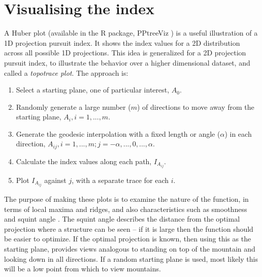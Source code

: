 \documentclass[]{interact}
\theoremstyle{plain}%
\theoremstyle{definition}
\theoremstyle{remark}
\def\tightlist{}
\begin{document}
\hypertarget{visualising-the-index}{%
\section{\texorpdfstring{Visualising the index
\label{sec:viz}}{Visualising the index }}\label{visualising-the-index}}

A Huber plot \citep{huberpp} (available in the R package, PPtreeViz
\citep{pptreeviz}) is a useful illustration of a 1D projection pursuit
index. It shows the index values for a 2D distribution across all
possible 1D projections. This idea is generalized for a 2D projection
pursuit index, to illustrate the behavior over a higher dimensional
dataset, and called a \emph{topotrace plot}. The approach is:

\begin{enumerate}
\def\labelenumi{\arabic{enumi}.}
\tightlist
\item
  Select a starting plane, one of particular interest, \(A_0\).
\item
  Randomly generate a large number (\(m\)) of directions to move away
  from the starting plane, \(A_i, i=1, ..., m\).
\item
  Generate the geodesic interpolation with a fixed length or angle
  (\(\alpha\)) in each direction,
  \(A_{ij}, i=1, ..., m; j=-\alpha, ..., 0, ..., \alpha\).
\item
  Calculate the index values along each path, \(I_{A_{ij}}\).
\item
  Plot \(I_{A_{ij}}\) against \(j\), with a separate trace for each
  \(i\).
\end{enumerate}

The purpose of making these plots is to examine the nature of the
function, in terms of local maxima and ridges, and also characteristics
such as smoothness and squint angle \citep{laa2020}. The squint angle
describes the distance from the optimal projection where a structure can
be seen -- if it is large then the function should be easier to
optimize. If the optimal projection is known, then using this as the
starting plane, provides views analogous to standing on top of the
mountain and looking down in all directions. If a random starting plane
is used, most likely this will be a low point from which to view
mountains.
\end{document}
